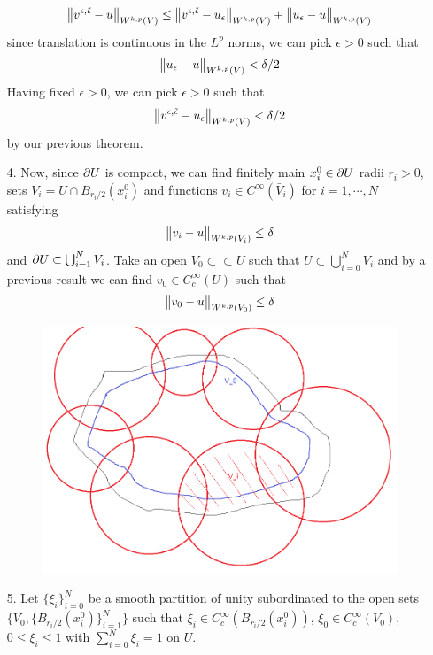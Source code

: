 \documentclass[12pt,a4paper]{report}
\newenvironment{proof}
{\begin{changemargin}{1cm}{0.5cm} 
	}%
	{\end{changemargin}
}
\begin{document}
\begin{proof}
\begin{itemize}
\begin{align*}
\bigl\lVert v^{\epsilon,\tilde{\epsilon}}-u\bigr\rVert_{W^{k,p}(V)} \leq \bigl\lVert v^{\epsilon,\tilde{\epsilon}}-u_{\epsilon}\bigr\rVert_{W^{k,p}(V)} + \bigl\lVert u_{\epsilon}-u\bigr\rVert_{W^{k,p}(V)}
\end{align*}
since translation is continuous in the $L^p$ norms, we can pick $\epsilon >0$ such that
\begin{align*}
\bigl\lVert u_{\epsilon}-u\bigr\rVert_{W^{k,p}(V)} < \delta /2
\end{align*}
Having fixed $\epsilon>0$, we can pick $\tilde{\epsilon}>0$ such that
\begin{align*}
\bigl\lVert v^{\epsilon,\tilde{\epsilon}}-u_{\epsilon}\bigr\rVert_{W^{k,p}(V)} < \delta /2
\end{align*}
by our previous theorem.
\item[4.] Now, since $\partial U$ is compact, we can find finitely main $x^0_i \in \partial U$ radii $r_i>0$, sets $V_i = U \cap B_{r_i /2}(x^0_i)$ and functions $v_i \in C^{\infty}(\bar{V}_i)$ for $i=1,\cdots,N$ satisfying
\begin{align*}
\bigl\lVert v_i - u\bigr\rVert_{W^{k,p}(V_i)} \leq \delta
\end{align*}
and $\partial U \subset \bigcup_{i=1}^N V_i$. Take an open $V_0 \subset \subset U$ such that $U \subset \bigcup_{i=0}^N V_i$ and by a previous result we can find $v_0 \in C^{\infty}_c(U)$ such that
\begin{align*}
\bigl\lVert v_0-u\bigr\rVert_{W^{k,p}(V_0)} \leq \delta
\end{align*}
\begin{figure}[h]
	\centering
	\includegraphics[scale=0.5]{4}
\end{figure}
\item[5.] Let $\{\xi_i\}_{i=0}^N$ be a smooth partition of unity subordinated to the open sets $\{V_0, \{B_{r_i/2}(x^0_i)\}_{i=1}^N \}$ such that $\xi_i \in C^{\infty}_c(B_{r_i/2}(x_i^0))$, $\xi_0 \in C_c^{\infty}(V_0)$, $0 \leq \xi_i \leq 1$ with $\sum_{i=0}^N \xi_i =1$ on $U$.


\end{itemize}
\end{proof}
\end{document}
